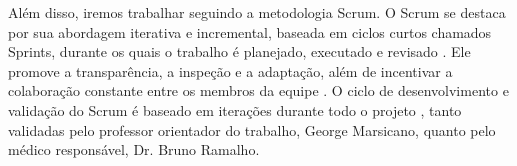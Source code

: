 Além disso, iremos trabalhar seguindo a metodologia Scrum. O Scrum se destaca por sua abordagem iterativa e incremental, baseada em ciclos curtos chamados Sprints, durante os quais o trabalho é planejado, executado e revisado \cite{schwaber2010}. Ele promove a transparência, a inspeção e a adaptação, além de incentivar a colaboração constante entre os membros da equipe \cite{schwaber2010}. O ciclo de desenvolvimento e validação do Scrum é baseado em iterações durante todo o projeto \cite{schwaber2010}, tanto validadas pelo professor orientador do trabalho, George Marsicano, quanto pelo médico responsável, Dr. Bruno Ramalho.